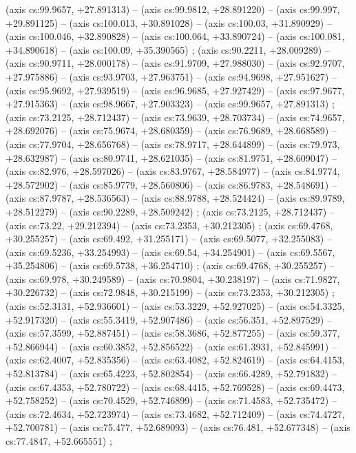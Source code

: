     (axis cs:99.9657,    +27.891313) --  (axis cs:99.9812,    +28.891220) --  (axis cs:99.997,    +29.891125) --  (axis cs:100.013,    +30.891028) --  (axis cs:100.03,    +31.890929) --  (axis cs:100.046,    +32.890828) --  (axis cs:100.064,    +33.890724) --  (axis cs:100.081,    +34.890618) --  (axis cs:100.09,    +35.390565) ;
    (axis cs:90.2211,    +28.009289) --  (axis cs:90.9711,    +28.000178) --  (axis cs:91.9709,    +27.988030) --  (axis cs:92.9707,    +27.975886) --  (axis cs:93.9703,    +27.963751) --  (axis cs:94.9698,    +27.951627) --  (axis cs:95.9692,    +27.939519) --  (axis cs:96.9685,    +27.927429) --  (axis cs:97.9677,    +27.915363) --  (axis cs:98.9667,    +27.903323) --  (axis cs:99.9657,    +27.891313) ;
    (axis cs:73.2125,    +28.712437) --  (axis cs:73.9639,    +28.703734) --  (axis cs:74.9657,    +28.692076) --  (axis cs:75.9674,    +28.680359) --  (axis cs:76.9689,    +28.668589) --  (axis cs:77.9704,    +28.656768) --  (axis cs:78.9717,    +28.644899) --  (axis cs:79.973,    +28.632987) --  (axis cs:80.9741,    +28.621035) --  (axis cs:81.9751,    +28.609047) --  (axis cs:82.976,    +28.597026) --  (axis cs:83.9767,    +28.584977) --  (axis cs:84.9774,    +28.572902) --  (axis cs:85.9779,    +28.560806) --  (axis cs:86.9783,    +28.548691) --  (axis cs:87.9787,    +28.536563) --  (axis cs:88.9788,    +28.524424) --  (axis cs:89.9789,    +28.512279) --  (axis cs:90.2289,    +28.509242) ;
    (axis cs:73.2125,    +28.712437) --  (axis cs:73.22,    +29.212394) --  (axis cs:73.2353,    +30.212305) ;
    (axis cs:69.4768,    +30.255257) --  (axis cs:69.492,    +31.255171) --  (axis cs:69.5077,    +32.255083) --  (axis cs:69.5236,    +33.254993) --  (axis cs:69.54,    +34.254901) --  (axis cs:69.5567,    +35.254806) --  (axis cs:69.5738,    +36.254710) ;
    (axis cs:69.4768,    +30.255257) --  (axis cs:69.978,    +30.249589) --  (axis cs:70.9804,    +30.238197) --  (axis cs:71.9827,    +30.226732) --  (axis cs:72.9848,    +30.215199) --  (axis cs:73.2353,    +30.212305) ;
    (axis cs:52.3131,    +52.936601) --  (axis cs:53.3229,    +52.927025) --  (axis cs:54.3325,    +52.917320) --  (axis cs:55.3419,    +52.907486) --  (axis cs:56.351,    +52.897529) --  (axis cs:57.3599,    +52.887451) --  (axis cs:58.3686,    +52.877255) --  (axis cs:59.377,    +52.866944) --  (axis cs:60.3852,    +52.856522) --  (axis cs:61.3931,    +52.845991) --  (axis cs:62.4007,    +52.835356) --  (axis cs:63.4082,    +52.824619) --  (axis cs:64.4153,    +52.813784) --  (axis cs:65.4223,    +52.802854) --  (axis cs:66.4289,    +52.791832) --  (axis cs:67.4353,    +52.780722) --  (axis cs:68.4415,    +52.769528) --  (axis cs:69.4473,    +52.758252) --  (axis cs:70.4529,    +52.746899) --  (axis cs:71.4583,    +52.735472) --  (axis cs:72.4634,    +52.723974) --  (axis cs:73.4682,    +52.712409) --  (axis cs:74.4727,    +52.700781) --  (axis cs:75.477,    +52.689093) --  (axis cs:76.481,    +52.677348) --  (axis cs:77.4847,    +52.665551) ;
